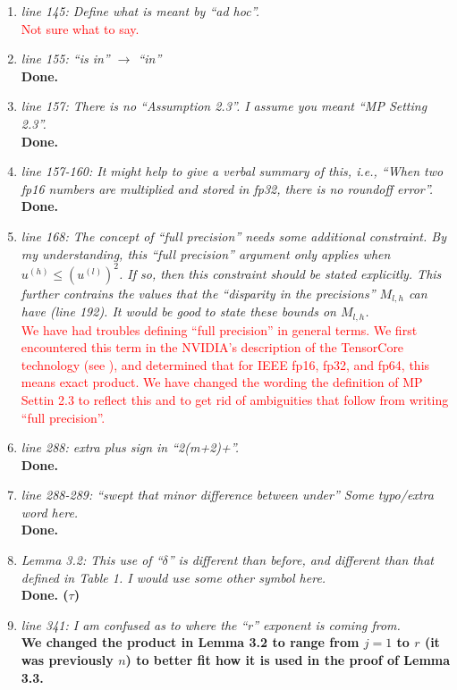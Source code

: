 \documentclass[final,onefignum,onetabnum]{siamart190516}
\newcommand{\red}[1]{\textcolor{red}{#1}}
\begin{document}
\begin{enumerate}
    {\bf Done.}
    \item {\it line 145: Define what is meant by ``ad hoc''. }\\
    \red{Not sure what to say.}
    \item {\it line 155: ``is in'' $\rightarrow $ ``in'' }\\
    {\bf Done.}
    \item {\it line 157: There is no ``Assumption 2.3''. I assume you meant ``MP Setting 2.3''. }\\
    {\bf Done.}
    \item {\it line 157-160: It might help to give a verbal summary of this, i.e., ``When two fp16 numbers are multiplied and stored in fp32, there is no roundoff error''. }\\
    {\bf Done.}
    \item {\it line 168: The concept of ``full precision'' needs some additional constraint. By my understanding, this ``full precision'' argument only applies when $u^{(h)} \leq (u^{(l)})^2$. If so, then this constraint should be stated explicitly. This further contrains the values that the ``disparity in the precisions'' $M_{l,h}$ can have (line 192). It would be good to state these bounds on $M_{l,h}$. }\\
    \red{We have had troubles defining ``full precision'' in general terms. We first encountered this term in the NVIDIA's description of the TensorCore technology (see \cite{Nvidia2017}), and determined that for IEEE fp16, fp32, and fp64, this means exact product. We have changed the wording the definition of MP Settin 2.3 to reflect this and to get rid of ambiguities that follow from writing ``full precision''.}
    \item {\it line 288: extra plus sign in ``2(m+2)+''. }\\
    {\bf Done.}
    \item {\it line 288-289: ``swept that minor difference between under'' Some typo/extra word here. }\\
    {\bf Done.}
    \item {\it Lemma 3.2: This use of ``$\delta$'' is different than before, and different than that defined in Table 1. I would use some other symbol here. }\\
    {\bf Done. ($\tau$)}
    \item {\it line 341: I am confused as to where the ``r'' exponent is coming from. }\\
    {\bf We changed the product in Lemma 3.2 to range from $j=1$ to $r$ (it was previously $n$) to better fit how it is used in the proof of Lemma 3.3. }

\end{enumerate}
\end{document}
